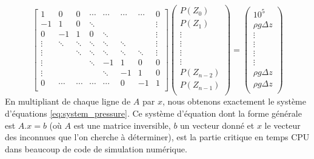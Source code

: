 \begin{equation}
\label{eq:ax_b}
\begin{bmatrix}
   1   &    0   &    0   & \cdots & \cdots & \cdots & \cdots &   0    \\
  -1   &    1   &    0   & \ddots &        &        &        & \vdots \\
   0   &   -1   &    1   &    0   & \ddots &        &        & \vdots \\
\vdots & \ddots & \ddots & \ddots & \ddots & \ddots &        & \vdots \\
\vdots &        & \ddots & \ddots & \ddots & \ddots & \ddots & \vdots \\
\vdots &        &        & \ddots &   -1   &    1   &    0   &   0    \\
\vdots &        &        &        & \ddots &   -1   &    1   &   0    \\
   0   & \cdots & \cdots & \cdots & \cdots &    0   &   -1   &   1    \\
\end{bmatrix}
\begin{pmatrix}
  P(Z_0)  \\
  P(Z_1)  \\
\vdots \\
\vdots \\
\vdots \\
\vdots \\
P(Z_{n-2}) \\
  P(Z_{n-1})  \\
\end{pmatrix}
=
\begin{pmatrix}
 10^5  \\
\rho{}g\Delta{z}     \\
\vdots \\
\vdots \\
\vdots \\
\vdots \\
\rho{}g\Delta{z} \\
\rho{}g\Delta{z}    \\
\end{pmatrix}
\end{equation}
En multipliant de chaque ligne de $A$ par $x$, nous obtenons exactement le système d'équations \eqref{eq:system_pressure}.
%
Ce système d'équation dont la forme générale est $A.x=b$ (où $A$ est une matrice inversible, $b$ un vecteur donné et $x$ le vecteur des inconnues que l'on cherche à déterminer), est la partie critique en temps CPU dans beaucoup de code de simulation numérique.
